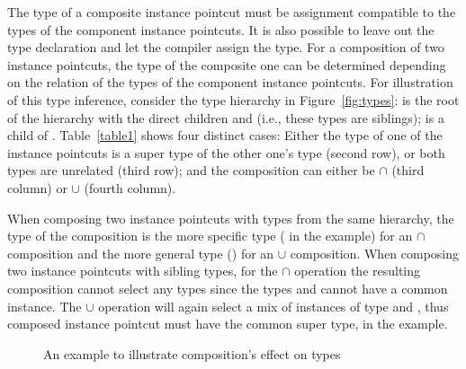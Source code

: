 The type of a composite instance pointcut must be assignment compatible to the types of the component instance pointcuts. It is also possible to leave out the type declaration and let the compiler assign the type.  For a composition of two instance pointcuts, the type of the composite one can be determined depending on the relation of the types of the component instance pointcuts. For illustration of this type inference, consider the type hierarchy in Figure~\ref{fig:types}:  is the root of the hierarchy with the direct children  and  (i.e., these types are siblings);  is a child of . Table~\ref{table1} shows four distinct cases: Either the type of one of the instance pointcuts is a super type of the other one's type (second row), or both types are unrelated (third row); and the composition can either be $\cap$ (third column) or $\cup$ (fourth column).

When composing two instance pointcuts with types from the same hierarchy, the type of the composition is the more specific type ( in the example) for an $\cap$ composition and the more general type () for an $\cup$ composition.
When composing two instance pointcuts with sibling types, for the $\cap$ operation the resulting composition cannot select any types since the types  and  cannot have a common instance. The $\cup$ operation will again select a mix of instances of type  and , thus composed instance pointcut must have the common super type,  in the example. 


\begin{figure}%
\centering
{}
\hspace{40pt}
\vspace{10pt}
\caption{An example to illustrate composition's effect on types}
\label{fig:compotypes}
\end{figure}

